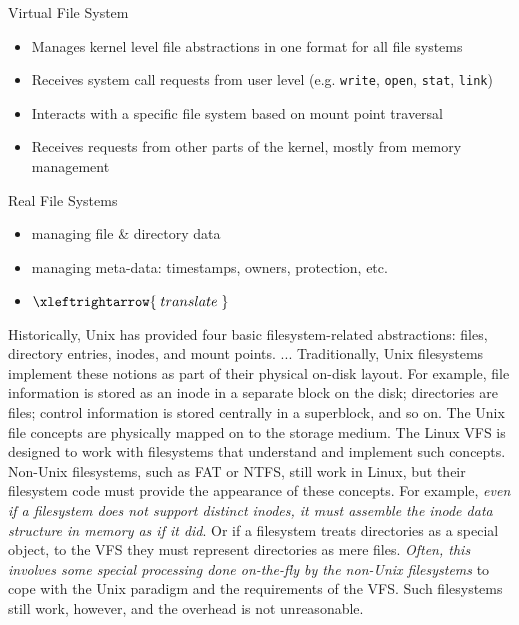 \begin{frame}
  \begin{block}{Virtual File System}
    \begin{itemize}
    \item Manages kernel level file abstractions in one format for all file systems
    \item Receives system call requests from user level (e.g. \texttt{write}, \texttt{open},
      \texttt{stat}, \texttt{link})
    \item Interacts with a specific file system based on mount point traversal
    \item Receives requests from other parts of the kernel, mostly from memory management
    \end{itemize}
  \end{block}
  \begin{block}{Real File Systems}
    \begin{itemize}
    \item managing file \& directory data
    \item managing meta-data: timestamps, owners, protection, etc.
    \item {} $\xleftrightarrow{\;translate\;}$ 
    \end{itemize}
  \end{block}
\end{frame}

Historically, Unix has provided four basic filesystem-related abstractions: files,
directory entries, inodes, and mount points. ... Traditionally, Unix filesystems implement
these notions as part of their physical on-disk layout. For example, file information is
stored as an inode in a separate block on the disk; directories are files; control
information is stored centrally in a superblock, and so on. The Unix file concepts are
physically mapped on to the storage medium. The Linux VFS is designed to work with
filesystems that understand and implement such concepts. Non-Unix filesystems, such as FAT
or NTFS, still work in Linux, but their filesystem code must provide the appearance of
these concepts. For example, \emph{even if a filesystem does not support distinct inodes,
  it must assemble the inode data structure in memory as if it did}. Or if a filesystem
treats directories as a special object, to the VFS they must represent directories as mere
files. \emph{Often, this involves some special processing done on-the-fly by the non-Unix
  filesystems} to cope with the Unix paradigm and the requirements of the VFS. Such
filesystems still work, however, and the overhead is not unreasonable.

